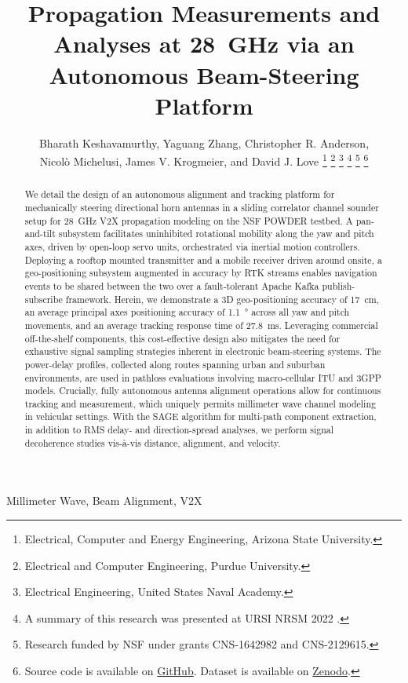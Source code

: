 \documentclass[10pt, twocolumn]{IEEEtran}
\title{Propagation Measurements and Analyses at \SI{28}{\giga\hertz} via an Autonomous Beam-Steering Platform}
\author{\vspace{-1mm}Bharath Keshavamurthy\IEEEauthorrefmark{1}, Yaguang Zhang\IEEEauthorrefmark{2}, Christopher R. Anderson\IEEEauthorrefmark{3},\\Nicol\`{o} Michelusi\IEEEauthorrefmark{1}, James V. Krogmeier\IEEEauthorrefmark{2}, and David J. Love\IEEEauthorrefmark{2}
\thanks{\IEEEauthorrefmark{1}Electrical, Computer and Energy Engineering, Arizona State University.}
\thanks{\IEEEauthorrefmark{2}Electrical and Computer Engineering, Purdue University.}
\thanks{\IEEEauthorrefmark{3}Electrical Engineering, United States Naval Academy.}
\thanks{A summary of this research was presented at URSI NRSM 2022 \cite{NRSM}.}
\thanks{Research funded by NSF under grants CNS-1642982 and CNS-2129615.}
\thanks{Source code is available on \href{https://github.com/bharathkeshavamurthy/SPAVE-28G.git}{GitHub}\cite{SPAVE-28G-Software}. Dataset is available on \href{https://doi.org/10.5281/zenodo.7178597}{Zenodo}\cite{SPAVE-28G-Dataset}.}
\vspace{-10mm}
}
\begin{document}

\maketitle
\thispagestyle{plain}
\pagestyle{plain}
\vspace{-10mm}

\begin{abstract}
We detail the design of an autonomous alignment and tracking platform for mechanically steering directional horn antennas in a sliding correlator channel sounder setup for \SI{28}{\giga\hertz} V$2$X propagation modeling on the NSF POWDER testbed. A pan-and-tilt subsystem facilitates uninhibited rotational mobility along the yaw and pitch axes, driven by open-loop servo units, orchestrated via inertial motion controllers. Deploying a rooftop mounted transmitter and a mobile receiver driven around onsite, a geo-positioning subsystem augmented in accuracy by RTK streams enables navigation events to be shared between the two over a fault-tolerant Apache Kafka publish-subscribe framework. Herein, we demonstrate a $3$D geo-positioning accuracy of \SI{17}{\centi\meter}, an average principal axes positioning accuracy of \SI{1.1}{\degree} across all yaw and pitch movements, and an average tracking response time of \SI{27.8}{\milli\second}. Leveraging commercial off-the-shelf components, this cost-effective design also mitigates the need for exhaustive signal sampling strategies inherent in electronic beam-steering systems. The power-delay profiles, collected along routes spanning urban and suburban environments, are used in pathloss evaluations involving macro-cellular ITU and $3$GPP models. Crucially, fully autonomous antenna alignment operations allow for continuous tracking and measurement, which uniquely permits millimeter wave channel modeling in vehicular settings. With the SAGE algorithm for multi-path component extraction, in addition to RMS delay- and direction-spread analyses, we perform signal decoherence studies vis-\`{a}-vis distance, alignment, and velocity.
\end{abstract}
\vspace{-1mm}

\begin{IEEEkeywords}
Millimeter Wave, Beam Alignment, V$2$X
\end{IEEEkeywords}
\vspace{-5mm}
\end{document}
